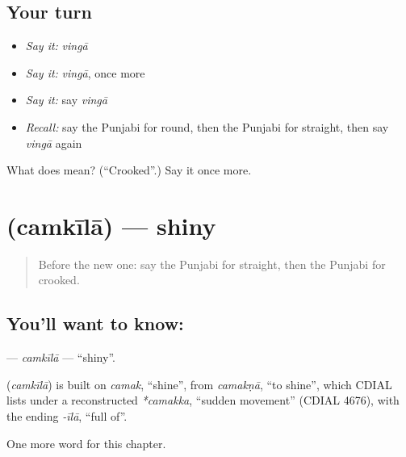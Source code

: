 \subsection*{Your turn}
\begin{itemize}
\raggedright
  \item \emph{Say it:} \emph{vingā}
  \item \emph{Say it:} \emph{vingā}, once more
  \item \emph{Say it:} say \emph{vingā}
  \item \emph{Recall:} say the Punjabi for round, then the Punjabi for straight, then say \emph{vingā} again
\end{itemize}

\begin{tcolorbox}[breakable,colback=teal!4,colframe=teal!35!black,title={Before you move on}]
What does  mean? (\textquotedblleft{}Crooked\textquotedblright{}.) Say it once more.
\end{tcolorbox}
\section[\texorpdfstring{\pa{ਚਮਕੀਲਾ} (camkīlā)}{ਚਮਕੀਲਾ (camkīlā)}]{ (camkīlā) — shiny}

\label{lesson:PA-C142-camkila}



\begin{quote}
Before the new one: say the Punjabi for straight, then the Punjabi for crooked.
\end{quote}

\subsection*{You'll want to know: }
\textbf{} — \emph{camkīlā} — \textquotedblleft{}shiny\textquotedblright{}.

\begin{cousinweb}
\textbf{} (\emph{camkīlā}) is built on \emph{camak}, \textquotedblleft{}shine\textquotedblright{}, from \emph{camakṇā}, \textquotedblleft{}to shine\textquotedblright{}, which CDIAL lists under a reconstructed \emph{*camakka}, \textquotedblleft{}sudden movement\textquotedblright{} (CDIAL 4676), with the ending \emph{-īlā}, \textquotedblleft{}full of\textquotedblright{}.
\end{cousinweb}

\begin{grammarlens}[title={What you've built}]
One more word for this chapter.
\end{grammarlens}

